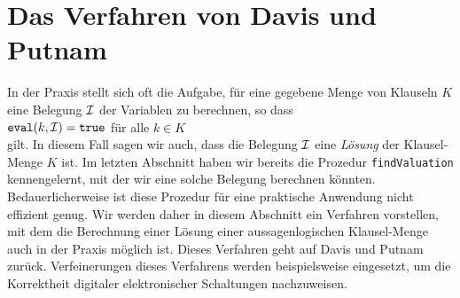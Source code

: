 \section{Das Verfahren von Davis und Putnam}
In der Praxis stellt sich oft die Aufgabe, f\"{u}r eine gegebene Menge von Klauseln $K$ eine
Belegung $\mathcal{I}$ der Variablen zu berechnen, so dass 
\\[0.2cm]
\hspace*{1.3cm} $\mathtt{eval}(k,\mathcal{I}) = \mathtt{true}$ \quad f\"{u}r alle $k\in K$ \\[0.2cm]
gilt.  In diesem Fall sagen wir auch, dass die Belegung $\mathcal{I}$ eine \emph{L\"{o}sung} der
 Klausel-Menge $K$ ist.  Im letzten Abschnitt haben wir bereits die Prozedur \texttt{findValuation}
 kennengelernt, mit der wir eine solche Belegung berechnen k\"{o}nnten.
Bedauerlicherweise ist diese Prozedur f\"{u}r eine praktische Anwendung nicht effizient genug.
Wir werden daher in diesem Abschnitt ein Verfahren vorstellen, mit dem die Berechnung einer L\"{o}sung
einer aussagenlogischen Klausel-Menge auch in der Praxis m\"{o}glich ist.
Dieses Verfahren geht auf Davis und Putnam
\cite{davis62} zur\"{u}ck.  Verfeinerungen dieses Verfahrens werden beispielsweise
eingesetzt, um die Korrektheit digitaler elektronischer Schaltungen nachzuweisen.  

